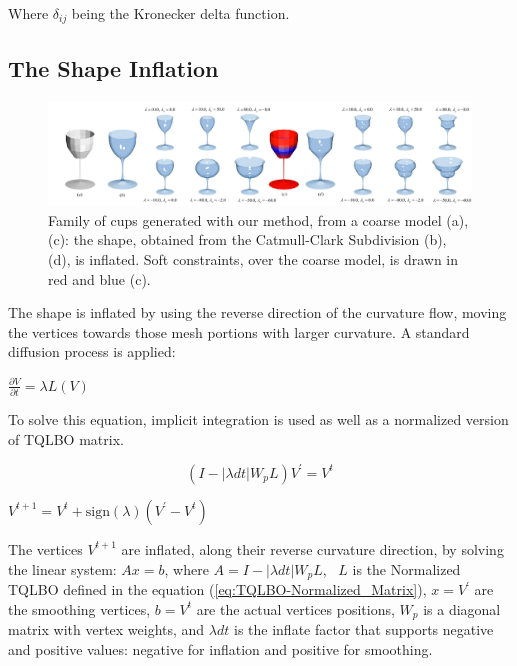 \documentclass[10pt, conference]{IEEEtran}
\begin{document}
Where $\delta_{ij}$ being the Kronecker delta function.


\subsection{The Shape Inflation\label{sub:Curvature-Enhancing}}

\begin{figure}[t]
\includegraphics[width=1\textwidth]{figs/teaser_cup}

\caption{\label{fig:Subdivision-Cups} Family of cups generated with our method,
from a coarse model (a), (c): the shape, obtained from the Catmull-Clark
Subdivision (b), (d), is inflated. Soft constraints, over the coarse
model, is drawn in red and blue (c).}


\end{figure}


The shape is inflated by using the reverse direction of the curvature
flow, moving the vertices towards those mesh portions with larger
curvature. A standard diffusion process is applied:

\begin{center}
$\frac{\partial V}{\partial t}=\lambda L\left(V\right)$ 
\par\end{center}

To solve this equation, implicit integration is used as well as a
normalized version of TQLBO matrix.

\begin{equation}
\left(I-\left|\lambda dt\right|W_{p}L\right)V^{\prime}=V^{t}\label{eq:Lineal_System_with_wp}
\end{equation}


\begin{center}
$V^{t+1}=V^{t}+\mbox{sign}\left(\lambda\right)\left(V^{\prime}-V^{t}\right)$
\par\end{center}

The vertices $V^{t+1}$ are inflated, along their reverse curvature
direction, by solving the linear system: $Ax=b$, where $A=I-\left|\lambda dt\right|W_{p}L$,~
$L$ is the Normalized TQLBO defined in the equation (\ref{eq:TQLBO-Normalized_Matrix}),
$x=V^{\prime}$ are the smoothing vertices, $b=V^{t}$ are the actual
vertices positions, $W_{p}$ is a diagonal matrix with vertex weights,
 and $\lambda dt$ is the inflate factor that supports negative
and positive values: negative for inflation and positive for smoothing. 
\end{document}
